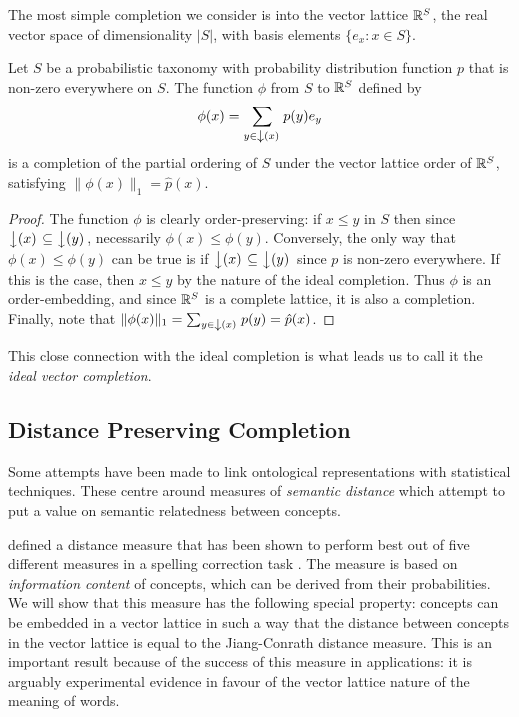 \documentclass{report}
\begin{document}
The most simple completion we consider is into the vector lattice $\mathbb{R}^S$, the real vector space of dimensionality $|S|$, with basis elements $\{e_x : x\in S\}$.
\begin{prop}
Let $S$ be a probabilistic taxonomy with probability distribution function $p$ that is non-zero everywhere on $S$. The function $\phi$ from $S$ to $\mathbb{R}^S$ defined by
$$\phi(x) = \sum_{y \in \left\downarrow(x)\right.} p(y)e_y$$
is a completion of the partial ordering of $S$ under the vector lattice order of $\mathbb{R}^S$, satisfying $\|\phi(x)\|_1 = \hat{p}(x)$.
\end{prop}
\begin{proof}
The function $\phi$ is clearly order-preserving: if $x \le y$ in $S$ then since $\left\downarrow(x)\right. \subseteq \left\downarrow(y)\right.$, necessarily $\phi(x) \le \phi(y)$. Conversely, the only way that $\phi(x) \le \phi(y)$ can be true is if $\left\downarrow(x)\right. \subseteq \left\downarrow(y)\right.$ since $p$ is non-zero everywhere. If this is the case, then $x \le y$ by the nature of the ideal completion. Thus $\phi$ is an order-embedding, and since $\mathbb{R}^S$ is a complete lattice, it is also a completion. Finally, note that $\|\phi(x)\|_1 = \sum_{y\in\left\downarrow(x)\right.} p(y) = \hat{p}(x)$.
\end{proof}
This close connection with the ideal completion is what leads us to call it the \emph{ideal vector completion}.


\subsection{Distance Preserving Completion}
\label{distance}

Some attempts have been made to link ontological representations with statistical techniques. These centre around measures of \emph{semantic distance} which attempt to put a value on semantic relatedness between concepts.

\cite{Jiang:97} defined a distance measure that has been shown to perform best out of five different measures in a spelling correction task \citep{Budanitsky:06}. The measure is based on \emph{information content} of concepts, which can be derived from their probabilities. We will show that this measure has the following special property: concepts can be embedded in a vector lattice in such a way that the distance between concepts in the vector lattice is equal to the Jiang-Conrath distance measure. This is an important result because of the success of this measure in applications: it is arguably experimental evidence in favour of the vector lattice nature of the meaning of words.
\end{document}
